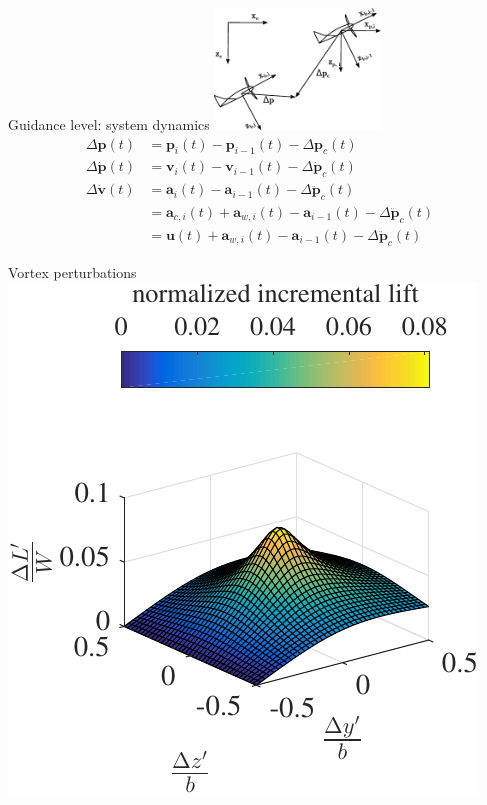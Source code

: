 \documentclass[12pt,svgnames,table,draft=false]{beamer}
\newcommand{\mbf}[1]{\mathbf{#1}}
\providecommand{\mbf}[1]{\mathbf{#1}}
\newcommand{\idxFollower}{{\ensuremath{i} }}
\newcommand{\idxPredecessor}{{\ensuremath{i-1} }}
\begin{document}
\begin{frame}{Guidance level: system dynamics}
\centering
\includegraphics[width=4.4cm]{frames.pdf}    %
\begin{align}
\Delta \mbf{p}(t) &= \mbf{p}_\idxFollower(t) - \mbf{p}_\idxPredecessor(t) - \Delta \mbf{p}_c(t)  \nonumber \\
\Delta \dot{\mbf{p}}(t) &= \mbf{v}_{\idxFollower}(t) - \mbf{v}_{\idxPredecessor}(t) -  \Delta \dot{\mbf{p}}_c(t) \nonumber \\
\Delta \dot{\mbf{v}}(t) &= \mbf{a}_\idxFollower(t) - \mbf{a}_\idxPredecessor(t) -  \Delta \ddot{\mbf{p}}_c(t) \nonumber \\
{} &= \mbf{a}_{c,\idxFollower}(t) + \mbf{a}_{w,\idxFollower}(t)
 - \mbf{a}_\idxPredecessor(t) -  \Delta \ddot{\mbf{p}}_c(t) \nonumber \\
{} &= \mbf{u}(t) + \mbf{a}_{w,\idxFollower}(t)
 - \mbf{a}_\idxPredecessor(t) -  \Delta \ddot{\mbf{p}}_c(t) \nonumber
\end{align}
\end{frame}

\begin{frame}{Vortex perturbations}
\centering
\includegraphics[height=.75\paperheight]{incrementallift.pdf}    %
\end{frame}
\end{document}
